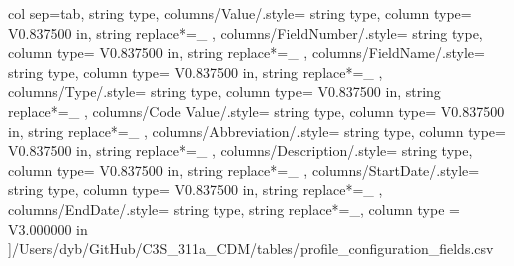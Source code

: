 \begin{landscape}
    col sep=tab,
    string type,
    columns/Value/.style={
            string type, 
            column type= V{0.837500 in}, 
            string replace*={_}{}
        },
    columns/FieldNumber/.style={
            string type, 
            column type= V{0.837500 in}, 
            string replace*={_}{}
        },
    columns/FieldName/.style={
            string type, 
            column type= V{0.837500 in}, 
            string replace*={_}{}
        },
    columns/Type/.style={
            string type, 
            column type= V{0.837500 in}, 
            string replace*={_}{}
        },
    columns/Code Value/.style={
            string type, 
            column type= V{0.837500 in}, 
            string replace*={_}{}
        },
    columns/Abbreviation/.style={
            string type, 
            column type= V{0.837500 in}, 
            string replace*={_}{}
        },
    columns/Description/.style={
            string type, 
            column type= V{0.837500 in}, 
            string replace*={_}{}
        },
    columns/StartDate/.style={
            string type, 
            column type= V{0.837500 in}, 
            string replace*={_}{}
        },
    columns/EndDate/.style={
            string type, 
            string replace*={_}{},
            column type = V{3.000000 in}
        }
    ]{/Users/dyb/GitHub/C3S_311a_CDM/tables/profile_configuration_fields.csv}
\end{landscape}

